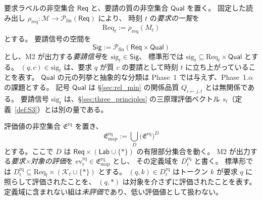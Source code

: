 \begin{definition}
\label{def:request_signal_types}
要求ラベルの非空集合 $\mathsf{Req}$ と、要請の質の非空集合 $\mathsf{Qual}$ を置く。
固定した読み出し $\rho_{\mathrm{req}}:\mathcal M\to\mathcal P_{\mathrm{fin}}(\mathsf{Req})$ により、
時刻 $t$ の\emph{要求の一覧}を
\[
  \mathrm{Req}_t:=\rho_{\mathrm{req}}(M_t)
\]
とする。
要請信号の空間を
\[
  \mathsf{Sig}:=\mathcal P_{\mathrm{fin}}(\mathsf{Req}\times\mathsf{Qual})
\]
とし、M2 が出力する\emph{要請信号}を $\mathrm{sig}_t\in\mathsf{Sig}$、
標準形では $\mathrm{sig}_t\subseteq\mathrm{Req}_t\times\mathsf{Qual}$ とする。
$(q,c)\in \mathrm{sig}_t$ は、要求 $q$ が質 $c$ の要請として時刻 $t$ に立ち上がっていることを表す。
$\mathsf{Qual}$ の元の列挙と抽象的な分類は Phase~1 では与えず、Phase~1.$\alpha$ の課題とする。
記号 $\mathsf{Qual}$ は \S\ref{sec:rel_min} の関係品質 $Q_{i\leftarrow j,t}$ とは無関係である。
要請信号 $\mathrm{sig}_t$ は、\S\ref{sec:three_principles} の三原理評価ベクトル $s_t$（定義~\ref{def:S3}）とは別の量である。
\end{definition}

\begin{definition}
\label{def:rq_eval_types}
評価値の非空集合 $\mathfrak E^{\mathrm{rq}}$ を置き、
\[
  \mathfrak E^{\mathrm{rq}}_{\mathrm{map}}
  :=
  \bigcup_{D}
  \bigl(\mathfrak E^{\mathrm{rq}}\bigr)^{D}
\]
とする。ここで $D$ は $\mathsf{Req}\times(\mathsf{Lab}\cup\{\ast\})$ の有限部分集合を動く。
M2 が出力する\emph{要求×対象の評価}を $\mathrm{ev}^{\mathrm{rq}}_t\in\mathfrak E^{\mathrm{rq}}_{\mathrm{map}}$ とし、
その定義域を $D^{\mathrm{rq}}_t$ と書く。
標準形では $D^{\mathrm{rq}}_t\subseteq\mathrm{Req}_t\times(\mathcal K_t\cup\{\ast\})$ とする。
$(q,k)\in D^{\mathrm{rq}}_t$ はトークン $k$ が要求 $q$ に照らして評価されたことを、
$(q,\ast)$ は対象を介さずに評価されたことを表す。
定義域に含まれない組は\emph{未評価}であり、低い評価値として扱わない。
\end{definition}

